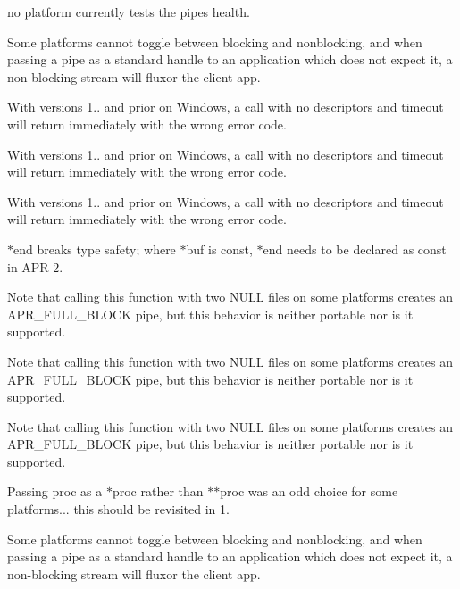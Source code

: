 \begin{DoxyRefList}
no platform currently tests the pipes health.  
\item[\label{bug__bug000002}%
\Hypertarget{bug__bug000002}%
Member \mbox{\hyperlink{group__apr__time_ga57bfe39a9516843a151a65cd02f84616}{A\+P\+R\+\_\+\+D\+E\+C\+L\+A\+RE}} (apr\+\_\+status\+\_\+t) apr\+\_\+time\+\_\+ansi\+\_\+put(apr\+\_\+time\+\_\+t $\ast$result]Some platforms cannot toggle between blocking and nonblocking, and when passing a pipe as a standard handle to an application which does not expect it, a non-\/blocking stream will fluxor the client app. 

With versions 1.. and prior on Windows, a call with no descriptors and timeout will return immediately with the wrong error code. 

With versions 1.. and prior on Windows, a call with no descriptors and timeout will return immediately with the wrong error code. 

With versions 1.. and prior on Windows, a call with no descriptors and timeout will return immediately with the wrong error code. 

$\ast$end breaks type safety; where $\ast$buf is const, $\ast$end needs to be declared as const in A\+PR 2. 

Note that calling this function with two N\+U\+LL files on some platforms creates an A\+P\+R\+\_\+\+F\+U\+L\+L\+\_\+\+B\+L\+O\+CK pipe, but this behavior is neither portable nor is it supported.

Note that calling this function with two N\+U\+LL files on some platforms creates an A\+P\+R\+\_\+\+F\+U\+L\+L\+\_\+\+B\+L\+O\+CK pipe, but this behavior is neither portable nor is it supported.

Note that calling this function with two N\+U\+LL files on some platforms creates an A\+P\+R\+\_\+\+F\+U\+L\+L\+\_\+\+B\+L\+O\+CK pipe, but this behavior is neither portable nor is it supported.

Passing proc as a $\ast$proc rather than $\ast$$\ast$proc was an odd choice for some platforms... this should be revisited in 1.  
\item[\label{bug__bug000002}%
\Hypertarget{bug__bug000002}%
Member \mbox{\hyperlink{group__apr__time_ga57bfe39a9516843a151a65cd02f84616}{A\+P\+R\+\_\+\+D\+E\+C\+L\+A\+RE}} (apr\+\_\+status\+\_\+t) apr\+\_\+time\+\_\+ansi\+\_\+put(apr\+\_\+time\+\_\+t $\ast$result]Some platforms cannot toggle between blocking and nonblocking, and when passing a pipe as a standard handle to an application which does not expect it, a non-\/blocking stream will fluxor the client app. 


\end{DoxyRefList}
